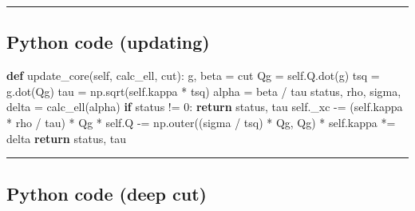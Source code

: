 \documentclass[]{article}
\newenvironment{Shaded}{}{}
\newcommand{\ControlFlowTok}[1]{\textcolor[rgb]{0.00,0.44,0.13}{\textbf{#1}}}
\newcommand{\DecValTok}[1]{\textcolor[rgb]{0.25,0.63,0.44}{#1}}
\newcommand{\KeywordTok}[1]{\textcolor[rgb]{0.00,0.44,0.13}{\textbf{#1}}}
\newcommand{\NormalTok}[1]{#1}
\newcommand{\OperatorTok}[1]{\textcolor[rgb]{0.40,0.40,0.40}{#1}}
\newcommand{\VariableTok}[1]{\textcolor[rgb]{0.10,0.09,0.49}{#1}}
\begin{document}
\begin{center}\rule{0.5\linewidth}{\linethickness}\end{center}

\hypertarget{python-code-updating}{%
\subsection{Python code (updating)}\label{python-code-updating}}

\begin{Shaded}
\begin{Highlighting}[]
\KeywordTok{def}\NormalTok{ update_core(}\VariableTok{self}\NormalTok{, calc_ell, cut):}
\NormalTok{    g, beta }\OperatorTok{=}\NormalTok{ cut}
\NormalTok{    Qg }\OperatorTok{=} \VariableTok{self}\NormalTok{.Q.dot(g)}
\NormalTok{    tsq }\OperatorTok{=}\NormalTok{ g.dot(Qg)}
\NormalTok{    tau }\OperatorTok{=}\NormalTok{ np.sqrt(}\VariableTok{self}\NormalTok{.kappa }\OperatorTok{*}\NormalTok{ tsq)}
\NormalTok{    alpha }\OperatorTok{=}\NormalTok{ beta }\OperatorTok{/}\NormalTok{ tau}
\NormalTok{    status, rho, sigma, delta }\OperatorTok{=}\NormalTok{ calc_ell(alpha)}
    \ControlFlowTok{if}\NormalTok{ status }\OperatorTok{!=} \DecValTok{0}\NormalTok{:}
        \ControlFlowTok{return}\NormalTok{ status, tau}
    \VariableTok{self}\NormalTok{._xc }\OperatorTok{-=}\NormalTok{ (}\VariableTok{self}\NormalTok{.kappa }\OperatorTok{*}\NormalTok{ rho }\OperatorTok{/}\NormalTok{ tau) }\OperatorTok{*}\NormalTok{ Qg}
\OperatorTok{*}   \VariableTok{self}\NormalTok{.Q }\OperatorTok{-=}\NormalTok{ np.outer((sigma }\OperatorTok{/}\NormalTok{ tsq) }\OperatorTok{*}\NormalTok{ Qg, Qg)}
\OperatorTok{*}   \VariableTok{self}\NormalTok{.kappa }\OperatorTok{*=}\NormalTok{ delta}
    \ControlFlowTok{return}\NormalTok{ status, tau}
\end{Highlighting}
\end{Shaded}

\begin{center}\rule{0.5\linewidth}{\linethickness}\end{center}

\hypertarget{python-code-deep-cut}{%
\subsection{Python code (deep cut)}\label{python-code-deep-cut}}
\end{document}
